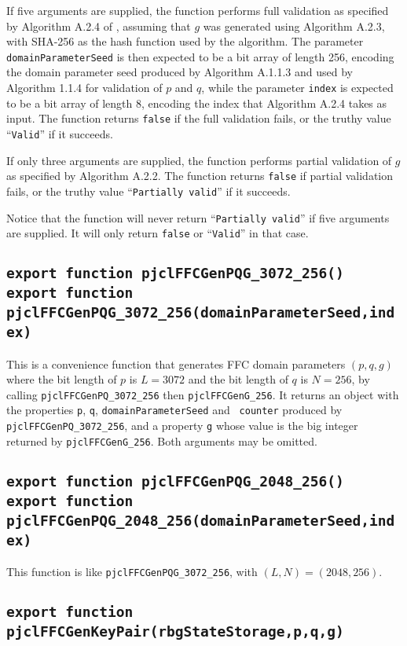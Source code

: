 \documentclass[12pt]{article}
\begin{document}
If five arguments are supplied, the function performs 
full validation as specified by Algorithm A.2.4 of \cite{DSS-4},
assuming that $g$ was generated using Algorithm A.2.3, with SHA-256 as the hash function used by the algorithm. 
The parameter {\tt domainParameterSeed} is then expected to be a bit array of length 256, 
encoding the domain parameter seed produced by Algorithm A.1.1.3 and used by Algorithm 1.1.4
for validation of $p$ and $q$, while the parameter {\tt index}
is expected to be a bit array of length 8, encoding the index that Algorithm A.2.4 takes as input.
The function returns {\tt false} if the full validation fails, or 
the truthy value ``{\tt Valid}'' if it succeeds.

If only three arguments are supplied, the function performs partial validation of $g$
as specified by Algorithm A.2.2.
The function returns {\tt false} if partial validation fails, or 
the truthy value ``{\tt Partially valid}'' if it succeeds.

Notice that the function will never return ``{\tt Partially valid}'' if 
five arguments are supplied.  It will only return {\tt false} or ``{\tt Valid}''
in that case.

\subsection{\tt export function pjclFFCGenPQG\_3072\_256()\\export function pjclFFCGenPQG\_3072\_256(domainParameterSeed,index)}

This is a convenience function that generates FFC domain parameters $(p,q,g)$ 
where the bit length of $p$ is $L = 3072$ and the bit length of $q$ is $N = 256$,
by calling {\tt pjclFFCGenPQ\_3072\_256} then {\tt pjclFFCGenG\_256}.  It returns an object with
the properties {\tt p}, {\tt q}, {\tt domainParameterSeed} and {\tt
  counter} produced by {\tt pjclFFCGenPQ\_3072\_256}, and a property {\tt g}
whose value is the big integer returned by {\tt pjclFFCGenG\_256}.
Both arguments may be omitted.

\subsection{\tt export function pjclFFCGenPQG\_2048\_256()\\export function pjclFFCGenPQG\_2048\_256(domainParameterSeed,index)}
This function is like {\tt pjclFFCGenPQG\_3072\_256}, with $(L,N) = (2048,256)$.

\subsection{\tt export function pjclFFCGenKeyPair(rbgStateStorage,p,q,g)}
\end{document}
